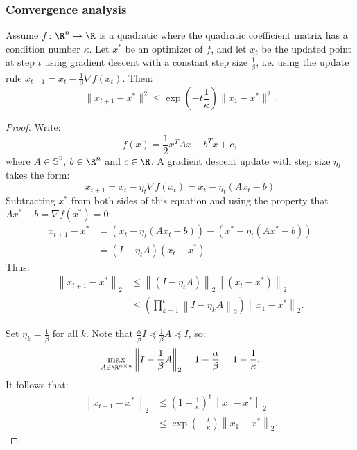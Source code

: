 \subsubsection{Convergence analysis}

\begin{theorem}
Assume $f\colon\R^n\to\R$ is a quadratic where the quadratic coefficient matrix has a condition number $\kappa$. Let $x^{*}$ be an optimizer of $f$, and let $x_{t}$ be the updated point at step $t$ using gradient descent with a constant step size $\frac{1}{\beta}$, i.e. using the update rule $x_{t+1} = x_t - \frac{1}{\beta}\nabla f(x_t)$. Then:
\begin{equation*}
\|x_{t+1} - x^*\|^2 \leq \exp\left(-t \frac{1}{\kappa}\right)\|x_1 - x^*\|^2.
\end{equation*}
\end{theorem}
\begin{proof}
Write:
\[
f(x) = \frac{1}{2}x^T A x - b^T x + c,
\]
where $A \in \mathbb{S}^n$, $b \in \R^n$ and $c \in \R$. A gradient descent update with step size $\eta_t$ takes the form:
\[
x_{t+1} = x_t - \eta_t \nabla f(x_t) = x_t - \eta_t \left(Ax_t - b\right)
\]
Subtracting $x^*$ from both sides of this equation and using the property that $Ax^* - b = \nabla f(x^*) = 0$:
\begin{align*}
x_{t+1} - x^* &= \left(x_t - \eta_t\left(Ax_t - b\right)\right) - \left(x^* - \eta_t\left(Ax^* - b\right)\right) \\
&= (I - \eta_t A)(x_t - x^*).
\end{align*}
Thus:
\begin{align*}
\left\|x_{t+1} - x^*\right\|_2 &\leq \left\|(I - \eta_t A)\right\|_2 \left\|(x_t - x^*)\right\|_2 \\
&\leq \left(\prod_{k=1}^t \left\| I - \eta_k A\right\|_2\right) \left\|x_1 - x^*\right\|_2.
\end{align*}

Set $\eta_k = \frac{1}{\beta}$ for all $k$. Note that $\frac{\alpha}{\beta}I \preceq \frac{1}{\beta}A \preceq I$, so:
\begin{equation*}
\max_{A \in \R^{n\times n}} \left\|I - \frac{1}{\beta} A\right \|_2 = 1 - \frac{\alpha}{\beta} = 1 - \frac{1}{\kappa}.
\end{equation*}
It follows that:
\begin{align*}
\left\|x_{t+1} - x^*\right\|_2 &\leq \left(1 - \frac{1}{\kappa}\right)^t \left\|x_1 - x^*\right\|_2 \\
&\leq \exp \left(-\frac{t}{\kappa}\right) \left\|x_1 - x^*\right\|_2.
\end{align*}
\end{proof}

